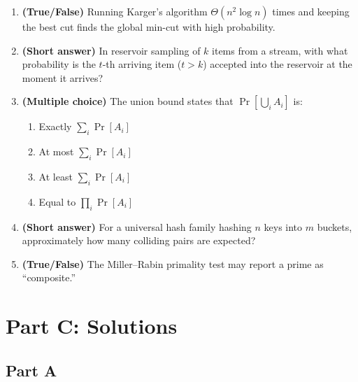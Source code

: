 \documentclass[11pt]{article}
\begin{document}
\begin{enumerate}[label=\textbf{B\arabic*.}, leftmargin=2.2em]
\item \textbf{(True/False)} Running Karger's algorithm $\Theta(n^2 \log n)$ times and
keeping the best cut finds the global min-cut with high probability.

\item \textbf{(Short answer)} In reservoir sampling of $k$ items from a stream, with what
probability is the $t$-th arriving item ($t > k$) accepted into the reservoir at the moment
it arrives?

\item \textbf{(Multiple choice)} The union bound states that $\Pr[\bigcup_i A_i]$ is:
\begin{enumerate}[label=(\alph*)]
    \item Exactly $\sum_i \Pr[A_i]$
    \item At most $\sum_i \Pr[A_i]$
    \item At least $\sum_i \Pr[A_i]$
    \item Equal to $\prod_i \Pr[A_i]$
\end{enumerate}

\item \textbf{(Short answer)} For a universal hash family hashing $n$ keys into $m$
buckets, approximately how many colliding pairs are expected?

\item \textbf{(True/False)} The Miller--Rabin primality test may report a prime as
``composite.''

\end{enumerate}

\newpage
\section*{Part C: Solutions}

\subsection*{Part A}
\end{document}
